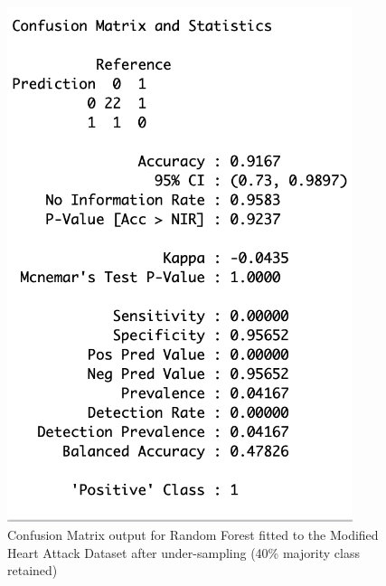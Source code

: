 \begin{figure}[!htbp]
    \centering
    \begin{minipage}{0.45\textwidth}
        \centering
        \includegraphics[width=0.9\textwidth]{ThesisTemplate/appendix/images/Chapter5Appendix/ConfusionMatrix40/modHA.png}
        \caption{Confusion Matrix output for Random Forest fitted to the Modified Heart Attack Dataset after under-sampling (40\% majority class retained)}
        \label{fig:my_label}
    \end{minipage}\hfill
    \begin{minipage}{0.45\textwidth}
        \centering

\end{minipage}
\end{figure}
